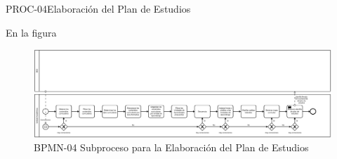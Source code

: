 \begin{BPMN}{PROC-04}{Elaboración del Plan de Estudios}{}
\end{BPMN}
En la figura \hyperref[]{}
\begin{figure}[htbp]
	\begin{center}
	\includegraphics[width=.95\textwidth]{C1-DP/SP4/Image/PlanDeEstudiosBPMN}
		\caption{BPMN-04 Subproceso para la  Elaboración del Plan de Estudios}
		\label{fig:BPMN-04}
	\end{center}
\end{figure}